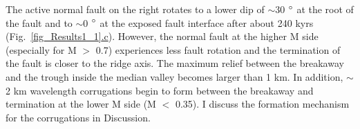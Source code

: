 
The active normal fault on the right rotates to a lower dip of $\sim$30 $\degree$ at the root of the fault and to $\sim$0 $\degree$ at the exposed fault interface after about 240 kyrs (Fig.~\hyperref[fig_Results1_1]{\ref{fig_Results1_1}.c}). However, the normal fault at the higher M side (especially for M $>$ 0.7) experiences less fault rotation and the termination of the fault is closer to the ridge axis. The maximum relief between the breakaway and the trough inside the median valley becomes larger than 1 km. In addition, $\sim$2 km wavelength corrugations begin to form between the breakaway and termination at the lower M side (M $<$ 0.35). I discuss the formation mechanism for the corrugations in Discussion.
%

